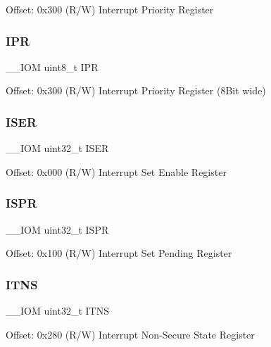 Offset\+: 0x300 (R/W) Interrupt Priority Register \mbox{\label{struct_n_v_i_c___type_a05eb0e8297dff88c314d42ab3d91320f}} 
\subsubsection{\texorpdfstring{IPR}{IPR}\hspace{0.1cm}{\footnotesize\ttfamily [2/2]}}
{\footnotesize\ttfamily \+\_\+\+\_\+\+I\+OM uint8\+\_\+t I\+PR}

Offset\+: 0x300 (R/W) Interrupt Priority Register (8Bit wide) \mbox{\label{struct_n_v_i_c___type_a040b60157eb7348b9325cb804333c48f}} 
\subsubsection{\texorpdfstring{ISER}{ISER}}
{\footnotesize\ttfamily \+\_\+\+\_\+\+I\+OM uint32\+\_\+t I\+S\+ER}

Offset\+: 0x000 (R/W) Interrupt Set Enable Register \mbox{\label{struct_n_v_i_c___type_a19081cde0360514d37cefa9b5fdfc0fe}} 
\subsubsection{\texorpdfstring{ISPR}{ISPR}}
{\footnotesize\ttfamily \+\_\+\+\_\+\+I\+OM uint32\+\_\+t I\+S\+PR}

Offset\+: 0x100 (R/W) Interrupt Set Pending Register \mbox{\label{struct_n_v_i_c___type_addfcdde1da9ca4b87b4b8068b5df0dda}} 
\subsubsection{\texorpdfstring{ITNS}{ITNS}}
{\footnotesize\ttfamily \+\_\+\+\_\+\+I\+OM uint32\+\_\+t I\+T\+NS}

Offset\+: 0x280 (R/W) Interrupt Non-\/\+Secure State Register \mbox{\label{struct_n_v_i_c___type_ada9cbba14ab1cc3fddd585f870932db8}} 
